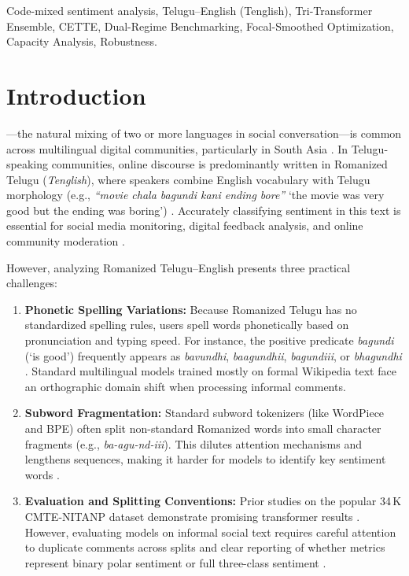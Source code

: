\documentclass[10pt,conference]{IEEEtran}
\begin{document}
\begin{IEEEkeywords}
Code-mixed sentiment analysis, Telugu--English (Tenglish), Tri-Transformer Ensemble, CETTE, Dual-Regime Benchmarking, Focal-Smoothed Optimization, Capacity Analysis, Robustness.
\end{IEEEkeywords}

\section{Introduction}
---the natural mixing of two or more languages in social conversation---is common across multilingual digital communities, particularly in South Asia \cite{patwa2020, chakravarthi2022}. In Telugu-speaking communities, online discourse is predominantly written in Romanized Telugu (\textit{Tenglish}), where speakers combine English vocabulary with Telugu morphology (e.g., \textit{``movie chala bagundi kani ending bore''} `the movie was very good but the ending was boring') \cite{kusampudi2021, rayala2023}. Accurately classifying sentiment in this text is essential for social media monitoring, digital feedback analysis, and online community moderation \cite{patwa2020}.

However, analyzing Romanized Telugu--English presents three practical challenges:
\begin{enumerate}
    \item \textbf{Phonetic Spelling Variations:} Because Romanized Telugu has no standardized spelling rules, users spell words phonetically based on pronunciation and typing speed. For instance, the positive predicate \textit{bagundi} (`is good') frequently appears as \textit{bavundhi}, \textit{baagundhii}, \textit{bagundiii}, or \textit{bhagundhi} \cite{rayala2023}. Standard multilingual models trained mostly on formal Wikipedia text face an orthographic domain shift when processing informal comments.
    \item \textbf{Subword Fragmentation:} Standard subword tokenizers (like WordPiece and BPE) often split non-standard Romanized words into small character fragments (e.g., \textit{ba-agu-nd-iii}). This dilutes attention mechanisms and lengthens sequences, making it harder for models to identify key sentiment words \cite{kakwani2020}.
    \item \textbf{Evaluation and Splitting Conventions:} Prior studies on the popular 34\,K CMTE-NITANP dataset demonstrate promising transformer results \cite{rayala2026}. However, evaluating models on informal social text requires careful attention to duplicate comments across splits and clear reporting of whether metrics represent binary polar sentiment or full three-class sentiment \cite{kaufman2012}.
\end{enumerate}
\end{document}
